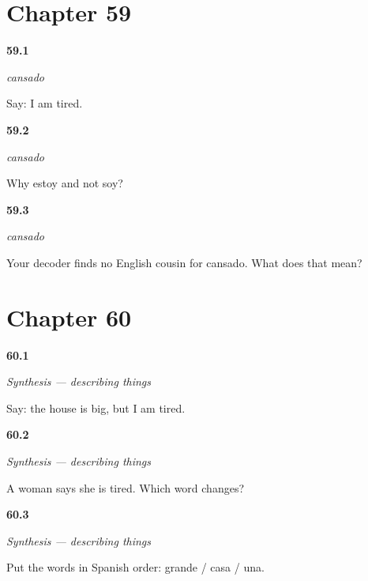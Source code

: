 \section*{Chapter 59}

\noindent\begin{minipage}[t]{\linewidth}
\raggedright
\hypertarget{review-ES-C09-cansado-say}{\textbf{59.1}} \emph{cansado}\par
\small Say: I am tired.
\end{minipage}\par\medskip

\noindent\begin{minipage}[t]{\linewidth}
\raggedright
\hypertarget{review-ES-C09-cansado-which}{\textbf{59.2}} \emph{cansado}\par
\small Why estoy and not soy?
\end{minipage}\par\medskip

\noindent\begin{minipage}[t]{\linewidth}
\raggedright
\hypertarget{review-ES-C09-cansado-nocousin}{\textbf{59.3}} \emph{cansado}\par
\small Your decoder finds no English cousin for cansado. What does that mean?
\end{minipage}\par\medskip

\section*{Chapter 60}

\noindent\begin{minipage}[t]{\linewidth}
\raggedright
\hypertarget{review-ES-C09-sintesis-describir-both}{\textbf{60.1}} \emph{Synthesis — describing things}\par
\small Say: the house is big, but I am tired.
\end{minipage}\par\medskip

\noindent\begin{minipage}[t]{\linewidth}
\raggedright
\hypertarget{review-ES-C09-sintesis-describir-shift}{\textbf{60.2}} \emph{Synthesis — describing things}\par
\small A woman says she is tired. Which word changes?
\end{minipage}\par\medskip

\noindent\begin{minipage}[t]{\linewidth}
\raggedright
\hypertarget{review-ES-C09-sintesis-describir-order}{\textbf{60.3}} \emph{Synthesis — describing things}\par
\small Put the words in Spanish order: grande / casa / una.
\end{minipage}\par\medskip

